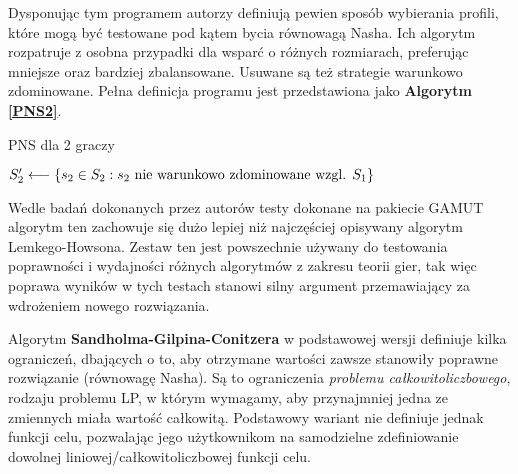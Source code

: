 \documentclass[polish]{standalone}
\begin{document}
Dysponując tym programem autorzy definiują pewien sposób wybierania profili, które mogą być testowane pod kątem bycia
równowagą Nasha. Ich algorytm rozpatruje z osobna przypadki dla wsparć o różnych rozmiarach, preferując mniejsze oraz
bardziej zbalansowane. Usuwane są też strategie warunkowo zdominowane. Pełna definicja programu jest przedstawiona jako
\textbf{Algorytm \ref{PNS2}}.

\begin{algorithm}
\caption{PNS dla 2 graczy}
\label{PNS2}
\begin{algorithmic}
  \STATE $S_2' \longleftarrow \{ s_2 \in S_2: s_2 \textrm{ nie warunkowo zdominowane wzgl. } S_1 \}$
      \ENDIF
    \ENDIF
   \ENDFOR
  \ENDIF
 \ENDFOR
\ENDFOR
\end{algorithmic}
\end{algorithm}

Wedle badań dokonanych przez autorów testy dokonane na pakiecie GAMUT algorytm ten zachowuje się dużo lepiej niż
najczęściej opisywany algorytm Lemkego-Howsona. Zestaw ten jest powszechnie używany do testowania poprawności
i wydajności różnych algorytmów z zakresu teorii gier, tak więc poprawa wyników w tych testach stanowi silny argument
przemawiający za wdrożeniem nowego rozwiązania.\cite{GAMUT}

Algorytm \textbf{Sandholma-Gilpina-Conitzera}\cite{SCG-NE} w podstawowej wersji definiuje kilka ograniczeń, dbających o
to, aby otrzymane wartości zawsze stanowiły poprawne rozwiązanie (równowagę Nasha). Są to ograniczenia \textit{problemu
całkowitoliczbowego}, rodzaju problemu LP, w którym wymagamy, aby przynajmniej jedna ze
zmiennych miała wartość całkowitą. Podstawowy wariant nie definiuje jednak funkcji celu, pozwalając jego użytkownikom
na samodzielne zdefiniowanie dowolnej liniowej/całkowitoliczbowej funkcji celu.
\end{document}
